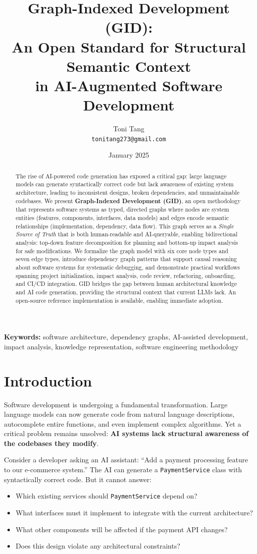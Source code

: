 \documentclass[11pt,a4paper]{article}
\title{Graph-Indexed Development (GID):\\An Open Standard for Structural Semantic Context\\in AI-Augmented Software Development}
\author{
    Toni Tang\\
    \texttt{tonitang273@gmail.com}
}
\date{January 2025}
\begin{document}
\maketitle

\begin{abstract}
The rise of AI-powered code generation has exposed a critical gap: large language models can generate syntactically correct code but lack awareness of existing system architecture, leading to inconsistent designs, broken dependencies, and unmaintainable codebases. We present \textbf{Graph-Indexed Development (GID)}, an open methodology that represents software systems as typed, directed graphs where nodes are system entities (features, components, interfaces, data models) and edges encode semantic relationships (implementation, dependency, data flow). This graph serves as a \emph{Single Source of Truth} that is both human-readable and AI-queryable, enabling bidirectional analysis: top-down feature decomposition for planning and bottom-up impact analysis for safe modifications. We formalize the graph model with six core node types and seven edge types, introduce dependency graph patterns that support causal reasoning about software systems for systematic debugging, and demonstrate practical workflows spanning project initialization, impact analysis, code review, refactoring, onboarding, and CI/CD integration. GID bridges the gap between human architectural knowledge and AI code generation, providing the structural context that current LLMs lack. An open-source reference implementation is available, enabling immediate adoption.
\end{abstract}

\textbf{Keywords:} software architecture, dependency graphs, AI-assisted development, impact analysis, knowledge representation, software engineering methodology

\section{Introduction}

Software development is undergoing a fundamental transformation. Large language models can now generate code from natural language descriptions, autocomplete entire functions, and even implement complex algorithms. Yet a critical problem remains unsolved: \textbf{AI systems lack structural awareness of the codebases they modify}.

Consider a developer asking an AI assistant: ``Add a payment processing feature to our e-commerce system.'' The AI can generate a \texttt{PaymentService} class with syntactically correct code. But it cannot answer:
\begin{itemize}[noitemsep]
    \item Which existing services should \texttt{PaymentService} depend on?
    \item What interfaces must it implement to integrate with the current architecture?
    \item What other components will be affected if the payment API changes?
    \item Does this design violate any architectural constraints?
\end{itemize}
\end{document}
